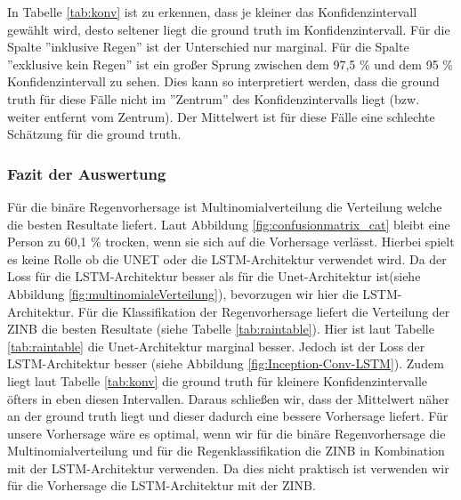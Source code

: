 \noindent In Tabelle \ref{tab:konv} ist zu erkennen, dass je kleiner das Konfidenzintervall gewählt wird, desto seltener liegt die ground truth im Konfidenzintervall.
Für die Spalte ''inklusive Regen'' ist der Unterschied nur marginal. Für die Spalte ''exklusive kein Regen'' ist ein großer Sprung zwischen dem 97,5 \% und dem 95 \% Konfidenzintervall zu sehen.
Dies kann so interpretiert werden, dass die ground truth für diese Fälle nicht im ''Zentrum'' des Konfidenzintervalls liegt (bzw. weiter entfernt vom Zentrum). Der Mittelwert ist für diese Fälle eine schlechte Schätzung für die ground truth.\\



\subsubsection{Fazit der Auswertung}

Für die binäre Regenvorhersage ist Multinomialverteilung die Verteilung welche die besten Resultate liefert. Laut Abbildung \ref{fig:confusionmatrix_cat} bleibt eine Person zu 60,1 \% trocken, wenn sie sich auf die Vorhersage verlässt. Hierbei spielt es keine Rolle ob die UNET oder die LSTM-Architektur verwendet wird. Da der Loss für die LSTM-Architektur besser als für die Unet-Architektur ist(siehe Abbildung \ref{fig:multinomialeVerteilung}), bevorzugen wir hier die LSTM-Architektur. Für die Klassifikation der Regenvorhersage liefert die Verteilung der ZINB die besten Resultate (siehe Tabelle \ref{tab:raintable}). Hier ist laut Tabelle \ref{tab:raintable} die Unet-Architektur marginal besser. Jedoch ist der Loss der LSTM-Architektur besser (siehe Abbildung \ref{fig:Inception-Conv-LSTM}). Zudem liegt laut Tabelle \ref{tab:konv} die ground truth für kleinere Konfidenzintervalle öfters in eben diesen Intervallen. Daraus schließen wir, dass der Mittelwert näher an der ground truth liegt und dieser dadurch eine bessere Vorhersage liefert. Für unsere Vorhersage wäre es optimal, wenn wir für die binäre Regenvorhersage die Multinomialverteilung und für die Regenklassifikation die ZINB in Kombination mit der LSTM-Architektur verwenden. Da dies nicht praktisch ist verwenden wir für die Vorhersage die LSTM-Architektur mit der ZINB.


